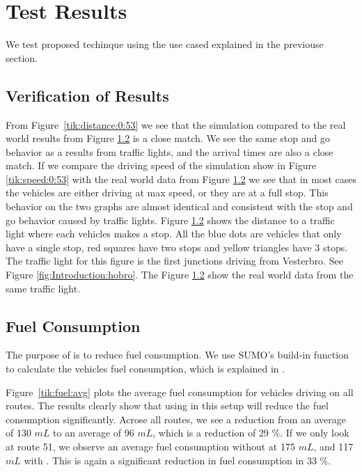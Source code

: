 \section{Test Results}
We test proposed techinque using the use cased explained in the previouse section.

\subsection{Verification of Results}

From Figure~\ref{tik:distance:0:53} we see that the simulation compared to the real world results from Figure \ref{} is a close match. 
We see the same stop and go behavior as a results from traffic lights, and the arrival times are also a close match. 
If we compare the driving speed of the simulation show in Figure \ref{tik:speed:0:53} with the real world data from Figure \ref{} we see that in most cases the vehicles are either driving at max speed, or they are at a full stop. 
This behavior on the two graphs are almost identical and consistent with the stop and go behavior caused by traffic lights. 
Figure \ref{} shows the distance to a traffic light where each vehicles makes a stop. 
All the blue dots are vehicles that only have a single stop, red squares have two stops and yellow triangles have 3 stops.
The traffic light for this figure is the first junctions driving from Vesterbro. See Figure \ref{fig:Introduction:hobro}. The Figure \ref{} show the real world data from the same traffic light. 
%
%
%
\subsection{Fuel Consumption}
The purpose of \tech is to reduce fuel consumption. 
We use SUMO's build-in function to calculate the vehicles fuel consumption, which is explained in \cite{SUMOFuel}.

Figure~\ref{tik:fuel:avg} plots the average fuel consumption for vehicles driving on all routes. 
The results clearly show that using \tech in this setup will reduce the fuel consumption significantly.
Acrose all routes, we see a reduction from an average of 130 $mL$ to an average of 96 $mL$, which is a reduction of 29 \%.
If we only look at route 51, we observe an average fuel consumption without \tech at 175 $mL$, and 117 $mL$ with \tech.
This is again a significant reduction in fuel consumption in 33 \%.

